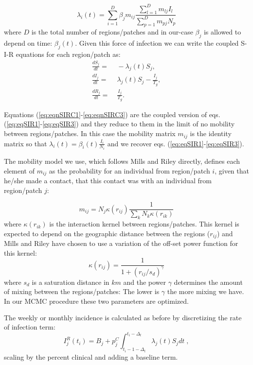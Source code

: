 \documentclass[a4paper]{article}
\begin{document}
\begin{equation}
\label{eq:eq5}
\lambda_{i}(t) = \sum_{i=1}^{D}{\beta_j m_{ij}} \frac{\sum_{l=1}^{D}{m_{lj}I_l}}{\sum_{p=1}^{D}{m_{pj}N_p}}
\end{equation}
where $D$ is the total number of regions/patches and in our-case $\beta_j$ is allowed to depend on time: $\beta_j(t)$. Given this force of infection we can write the coupled S-I-R equations for each region/patch as:
\begin{align}
\frac{dS_j}{dt} =&\; - \lambda_j(t)S_j, \label{eq:eqnSIRC1} \\
\frac{dI_j}{dt} =&\;  \lambda_j(t)S_j - \frac{I_j}{T_g}, \label{eq:eqnSIRC2} \\
\frac{dR_j}{dt} =&\; \frac{I_j}{T_g}. \label{eq:eqnSIRC3}
\end{align}

Equations (\ref{eq:eqnSIRC1}-\ref{eq:eqnSIRC3}) are the coupled version of eqs. (\ref{eq:eqSIR1}-\ref{eq:eqSIR3}) and they reduce to them in the limit of no mobility between regions/patches. In this case the mobility matrix $m_{ij}$ is the identity matrix so that $\lambda_{i}(t) =  \beta_i(t) \frac{I_i}{N_i}$ and we recover eqs. (\ref{eq:eqSIR1}-\ref{eq:eqSIR3}).

The mobility model we use, which follows Mills and Riley\cite{mills2014spatial} directly, defines each element of $m_{ij}$ as the probability for an individual from region/patch $i$, given that he/she made a contact, that this contact was with an individual from region/patch $j$:

\begin{equation}
\label{eq:mij}
m_{ij} = N_j \kappa(r_{ij})\frac{1}{\sum_{k} {N_k\kappa(r_{ik})}}
\end{equation}
where $\kappa(r_{ik})$ is the interaction kernel between regions/patches. This kernel is expected to depend on the geographic distance between the regions ($r_{ij}$) and Mills and Riley \cite{mills2014spatial} have chosen to use a variation of the off-set power function for this kernel:
\begin{equation}
\label{eq:kappa}
\kappa(r_{ij}) = \frac{1}{1+{(r_{ij}/s_d)}^\gamma}
\end{equation}
where $s_d$ is a saturation distance in $km$ and the power $\gamma$ determines the amount of mixing between the regions/patches: The lower is $\gamma$ the more mixing we have.
In our MCMC procedure these two parameters are optimized.

The weekly or monthly incidence is calculated as before by discretizing the rate of infection term:
\begin{equation}
I_j^R(t_i) = B_j + p_j^C \int_{t_i-1-\Delta_t}^{t_i-\Delta_t} {\lambda_j(t)S_j} dt\;,
\label{eq:IncSIRC}
\end{equation}
scaling by the percent clinical and adding a baseline term.
\end{document}
